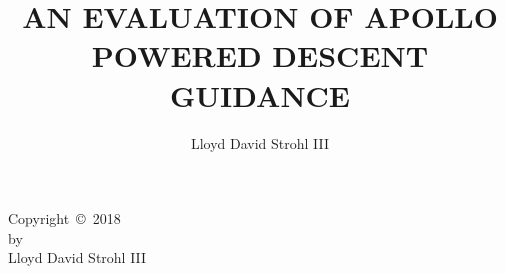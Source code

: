 \documentclass{sdsu-thesis}
\author{Lloyd David Strohl III}
\title{AN EVALUATION OF APOLLO \\
  POWERED DESCENT GUIDANCE }
\theoremstyle{dtm}
\begin{document}
\maketitle

\makesignature

\begin{copyrightpage}
  Copyright~\copyright~2018 \\
  by \\
  Lloyd David Strohl III
\end{copyrightpage}



\begin{abstract}
  
\end{abstract}

\tableofcontents

\listoftables

\listoffigures
%
\end{document}
